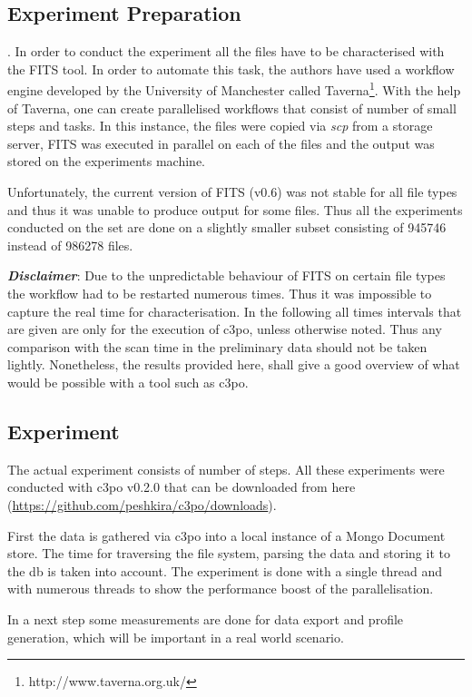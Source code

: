 \subsection{Experiment Preparation}.
In order to conduct the experiment all the files have to be characterised with the FITS tool.
In order to automate this task, the authors have used a workflow engine developed by the University of Manchester called Taverna\footnote{http://www.taverna.org.uk/}.
With the help of Taverna, one can create parallelised workflows that consist of number of small steps and tasks.
In this instance, the files were copied via \textit{scp} from a storage server, FITS was executed in parallel on each of the files and the output was stored on the experiments machine.

Unfortunately, the current version of FITS (v0.6) was not stable for all file types and thus it was unable to produce output for some files.
Thus all the experiments conducted on the set are done on a slightly smaller subset consisting of 945746 instead of 986278 files.

\textbf{\textit{Disclaimer}}: Due to the unpredictable behaviour of FITS on certain file types the workflow had to be restarted numerous times.
Thus it was impossible to capture the real time for characterisation.
In the following all times intervals that are given are only for the execution of c3po, unless otherwise noted.
Thus any comparison with the scan time in the preliminary data should not be taken lightly.
Nonetheless, the results provided here, shall give a good overview of what would be possible with a tool such as c3po.

\subsection{Experiment}
The actual experiment consists of number of steps.
All these experiments were conducted with c3po v0.2.0 that can be downloaded from here (\url{https://github.com/peshkira/c3po/downloads}). 

First the data is gathered via c3po into a local instance of a Mongo Document store.
The time for traversing the file system, parsing the data and storing it to the db is taken into account.
The experiment is done with a single thread and with numerous threads to show the performance boost of the parallelisation.

In a next step some measurements are done for data export and profile generation, which will be important in a real world scenario.

